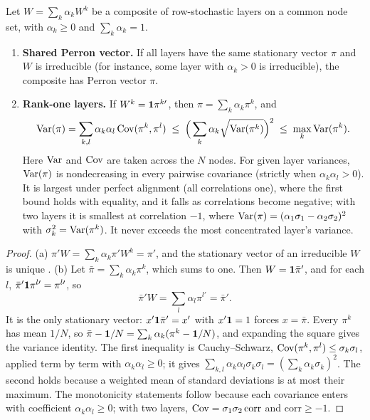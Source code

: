 \documentclass[../structural_economics_book.tex]{subfiles}
\begin{document}
\begin{proposition}\label{ch22:thm:alignment}
Let $W = \sum_k \alpha_k W^k$ be a composite of row-stochastic layers on a common node set, with $\alpha_k \ge 0$ and $\sum_k \alpha_k = 1$.
\begin{enumerate}
\item[(a)] \textbf{Shared Perron vector.} If all layers have the same stationary vector $\pi$ and $W$ is irreducible (for instance, some layer with $\alpha_k > 0$ is irreducible), the composite has Perron vector $\pi$.
\item[(b)] \textbf{Rank-one layers.} If $W^k = \mathbf{1}\pi^{k\prime}$, then $\pi = \sum_k \alpha_k \pi^k$, and
\[
\operatorname{Var}(\pi) = \sum_{k,l}\alpha_k\alpha_l \operatorname{Cov}(\pi^k, \pi^l) \;\le\; \Big(\sum_k \alpha_k \sqrt{\operatorname{Var}(\pi^k)}\Big)^2 \;\le\; \max_k \operatorname{Var}(\pi^k).
\]
Here $\operatorname{Var}$ and $\operatorname{Cov}$ are taken across the $N$ nodes. For given layer variances, $\operatorname{Var}(\pi)$ is nondecreasing in every pairwise covariance (strictly when $\alpha_k\alpha_l > 0$). It is largest under perfect alignment (all correlations one), where the first bound holds with equality, and it falls as correlations become negative; with two layers it is smallest at correlation $-1$, where $\operatorname{Var}(\pi) = (\alpha_1\sigma_1 - \alpha_2\sigma_2)^2$ with $\sigma_k^2 = \operatorname{Var}(\pi^k)$. It never exceeds the most concentrated layer's variance.
\end{enumerate}
\end{proposition}

\begin{proof}
(a) $\pi'W = \sum_k\alpha_k\pi'W^k = \pi'$, and the stationary vector of an irreducible $W$ is unique \citep[Thm.~1.5]{seneta2006nonnegative}. (b) Let $\bar\pi = \sum_k\alpha_k\pi^k$, which sums to one. Then $W = \mathbf{1}\bar\pi'$, and for each $l$, $\bar\pi'\mathbf{1}\pi^{l\prime} = \pi^{l\prime}$, so
\[
\bar\pi'W = \sum_l\alpha_l\pi^{l\prime} = \bar\pi'.
\]
It is the only stationary vector: $x'\mathbf{1}\bar\pi' = x'$ with $x'\mathbf{1} = 1$ forces $x = \bar\pi$. Every $\pi^k$ has mean $1/N$, so $\bar\pi - \mathbf{1}/N = \sum_k\alpha_k(\pi^k - \mathbf{1}/N)$, and expanding the square gives the variance identity. The first inequality is Cauchy--Schwarz, $\operatorname{Cov}(\pi^k,\pi^l) \le \sigma_k\sigma_l$, applied term by term with $\alpha_k\alpha_l \ge 0$; it gives $\sum_{k,l}\alpha_k\alpha_l\sigma_k\sigma_l = (\sum_k\alpha_k\sigma_k)^2$. The second holds because a weighted mean of standard deviations is at most their maximum. The monotonicity statements follow because each covariance enters with coefficient $\alpha_k\alpha_l \ge 0$; with two layers, $\operatorname{Cov} = \sigma_1\sigma_2\,\mathrm{corr}$ and $\mathrm{corr} \ge -1$.
\end{proof}
\end{document}
